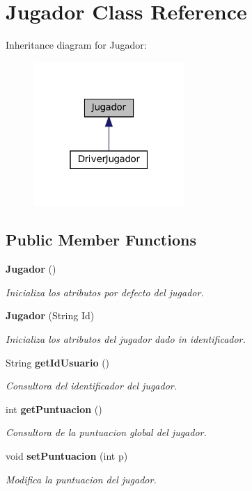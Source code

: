 \section{Jugador Class Reference}
\label{class_dominio_1_1clases_1_1_jugador}


Inheritance diagram for Jugador\+:
\nopagebreak
\begin{figure}[H]
\begin{center}
\leavevmode
\includegraphics[width=163pt]{class_dominio_1_1clases_1_1_jugador__inherit__graph}
\end{center}
\end{figure}
\subsection*{Public Member Functions}
\begin{DoxyCompactItemize}
\item 
\textbf{ Jugador} ()
\begin{DoxyCompactList}\small\item\em Inicializa los atributos por defecto del jugador. \end{DoxyCompactList}\item 
\textbf{ Jugador} (String Id)
\begin{DoxyCompactList}\small\item\em Inicializa los atributos del jugador dado in identificador. \end{DoxyCompactList}\item 
String \textbf{ get\+Id\+Usuario} ()
\begin{DoxyCompactList}\small\item\em Consultora del identificador del jugador. \end{DoxyCompactList}\item 
int \textbf{ get\+Puntuacion} ()
\begin{DoxyCompactList}\small\item\em Consultora de la puntuacion global del jugador. \end{DoxyCompactList}\item 
void \textbf{ set\+Puntuacion} (int p)
\begin{DoxyCompactList}\small\item\em Modifica la puntuacion del jugador. \end{DoxyCompactList}\end{DoxyCompactItemize}
